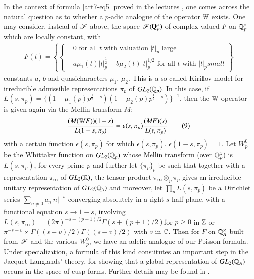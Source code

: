 In the context of formula \eqref{art7-eq5} proved in the lectures \cite{art7-I}, one comes across the natural question as to whether a $p$-adic analogue of the operator $\mathbb{W}$ exists. One may consider, instead of $\mathscr{F}$ above, the space $\mathscr{F} (\mathbf{Q}^x_p)$ of complex-valued $F$ on $\mathbb{Q}^x_p$ which are locally constant, with 
\begin{align*}
F(t) = 
\left\{ 
\begin{cases}
& \text{0 for all  $t$ with valuation $|t|_p$ large}\\
& a \mu_1 (t) |t|^{\frac{1}{2}}_p + b \mu_2 (t) |t|^{1/2}_p \text{ for all } t \text{ with } |t|_p small 
\end{cases}
\right\}\tag{8} \label{art7-eq8}
\end{align*}
constants $a$, $b$ and quasicharacters $\mu_1$, $\mu_2$. This is a so-called Kirillov model for irreducible admissible representations $\pi_p$ of $GL_2 (\mathbb{Q}_p)$. In this case, if $L(s, \pi_p) = \{(1-\mu_1 (p)p^{\frac{1}{2}-s}) (1-\mu_2 (p) p^{\frac{1}{2} -s})\}^{-1}$, then the $\mathbb{W}$-operator is given again via the Mellin transform $M$:
\begin{equation*}
\frac{(M (\mathbb{W} F)) (1-s)}{L(1-s, \pi_p)} =\epsilon (s, \pi_p) \frac{(MF) (s)}{L(s, \pi_p)}\tag{9} \label{art7-eq9}
\end{equation*}
with a certain function $\epsilon (s, \pi_p)$ for which $\epsilon (s, \pi_p)$. $\epsilon (1-s ,\pi_p) =1$. Let $W^0_p$ be the Whittaker function on $GL_2 (\mathbb{Q}_p)$ whose Mellin transform (over $\mathbb{Q}^x_p$) is $L(s, \pi_p)$, for every prime $p$ and further let $\{\pi_p\}_p$ be such that together with a representation $\pi_\infty$ of $GL_2 (\mathbb{R})$, the tensor product $\pi_\infty \otimes_p \pi_p$ gives an irreducible unitary representation of $GL_2 (\mathbb{Q}_A)$ and moreover, let $\prod\limits_p L (s, \pi_p)$ be a Dirichlet series $\sum\limits_{n \neq 0} a_n |n|^{-s}$ converging absolutely in a right $s$-half plane, with a functional equation $s \to 1 -s$, involving $L(s, \pi_\infty) = (2 \pi)^{-s-(p+1)/2} \Gamma (s+(p+1)/2)$\pageoriginale for $p \geqslant 0$ in $\mathbb{Z}$ or $\pi^{-s - v } \times \Gamma ((s+v)/2) \Gamma ((s-v)/2)$ with $v$ in $\mathbb{C}$. Then for $F$ on $\mathbb{Q}^\times_A$ built from $\mathscr{F}$ and the various $W^0_p$, we have an adelic analogue of our Poisson formula. Under specialization, a formula of this kind constitutes an important step in the Jacquet-Langlands' theory, for showing that a global representation of $GL_2 (\mathbb{Q}_A)$ occurs in the space of cusp forms. Further details may be found in \cite{art7-R-R}.

